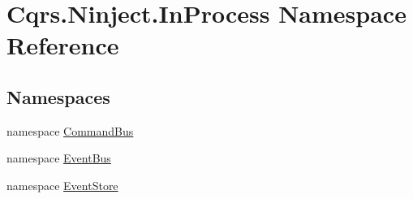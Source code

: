 \hypertarget{namespaceCqrs_1_1Ninject_1_1InProcess}{}\section{Cqrs.\+Ninject.\+In\+Process Namespace Reference}
\label{namespaceCqrs_1_1Ninject_1_1InProcess}
\subsection*{Namespaces}
\begin{DoxyCompactItemize}
\item 
namespace \hyperlink{namespaceCqrs_1_1Ninject_1_1InProcess_1_1CommandBus}{Command\+Bus}
\item 
namespace \hyperlink{namespaceCqrs_1_1Ninject_1_1InProcess_1_1EventBus}{Event\+Bus}
\item 
namespace \hyperlink{namespaceCqrs_1_1Ninject_1_1InProcess_1_1EventStore}{Event\+Store}
\end{DoxyCompactItemize}

